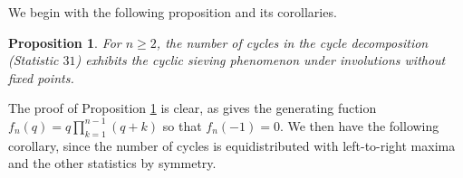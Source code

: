 \documentclass{amsart}
\newtheorem{prop}[thm]{Proposition}
\theoremstyle{definition}
\begin{document}

We begin with the following proposition and its corollaries. 

\begin{prop}\label{thm:rev_comp_cyc_decomp}
  For $n \geq 2$, %
  the number of cycles in the cycle decomposition (Statistic $31$) exhibits the cyclic sieving phenomenon under involutions without fixed points.
\end{prop}

The proof of Proposition \ref{thm:rev_comp_cyc_decomp} is clear, as \cite{Stanley2011} gives the generating fuction $f_n(q) = q \prod_{k=1}^{n-1} (q+k)$ so that $f_n(-1)=0$. %
We then have the following corollary, since the number of cycles is equidistributed with left-to-right maxima~\cite[Prop.~1.3.1]{Stanley2011} and the other statistics by symmetry.
\end{document}
